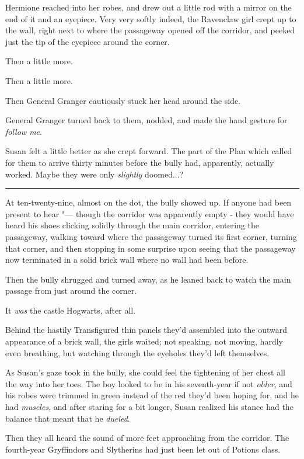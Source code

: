 Hermione reached into her robes, and drew out a little rod with a mirror
on the end of it and an eyepiece. Very very softly indeed, the Ravenclaw
girl crept up to the wall, right next to where the passageway opened off
the corridor, and peeked just the tip of the eyepiece around the corner.

Then a little more.

Then a little more.

Then General Granger cautiously stuck her head around the side.

General Granger turned back to them, nodded, and made the hand gesture
for \emph{follow me}.

Susan felt a little better as she crept forward. The part of the Plan
which called for them to arrive thirty minutes before the bully had,
apparently, actually worked. Maybe they were only \emph{slightly}
doomed...?

\begin{center}\rule{3in}{0.4pt}\end{center}

At ten-twenty-nine, almost on the dot, the bully showed up. If anyone
had been present to hear "--- though the corridor was apparently empty -
they would have heard his shoes clicking solidly through the main
corridor, entering the passageway, walking toward where the passageway
turned its first corner, turning that corner, and then stopping in some
surprise upon seeing that the passageway now terminated in a solid brick
wall where no wall had been before.

Then the bully shrugged and turned away, as he leaned back to watch the
main passage from just around the corner.

It \emph{was} the castle Hogwarts, after all.

Behind the hastily Transfigured thin panels they'd assembled into the
outward appearance of a brick wall, the girls waited; not speaking, not
moving, hardly even breathing, but watching through the eyeholes they'd
left themselves.

As Susan's gaze took in the bully, she could feel the tightening of her
chest all the way into her toes. The boy looked to be in his
seventh-year if not \emph{older}, and his robes were trimmed in green
instead of the red they'd been hoping for, and he had \emph{muscles},
and after staring for a bit longer, Susan realized his stance had the
balance that meant that he \emph{dueled}.

Then they all heard the sound of more feet approaching from the
corridor. The fourth-year Gryffindors and Slytherins had just been let
out of Potions class.

